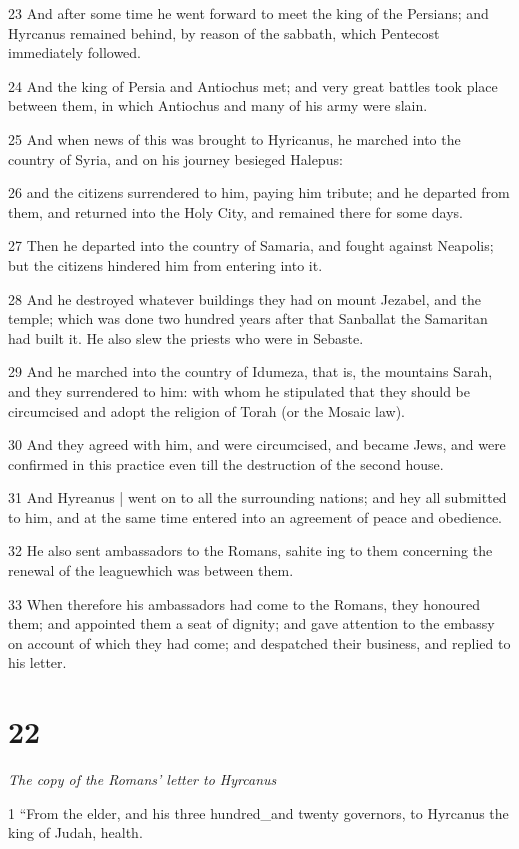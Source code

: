 23 And after some time he went forward to meet the king of the Persians; and Hyrcanus remained behind, by reason of the sabbath, which Pentecost immediately followed. 

24 And the king of Persia and Antiochus met; and very great battles took place between them, in which Antiochus and many of his army were slain. 

25 And when news of this was brought to Hyricanus, he marched into the country of Syria, and on his journey besieged Halepus: 

26 and the citizens surrendered to him, paying him tribute; and he departed from them, and returned into the Holy City, and remained there for some days.

27 Then he departed into the country of Samaria, and fought against Neapolis; but the citizens hindered him from entering into it. 

28 And he destroyed whatever buildings they had on mount Jezabel, and the temple; which was done two hundred years after that Sanballat the Samaritan had built it. He also slew the priests who were in Sebaste. 

29 And he marched into the country of Idumeza, that is, the mountains Sarah, and they surrendered to him: with whom he stipulated that they should be circumcised and adopt the religion of Torah (or the Mosaic law). 

30 And they agreed with him, and were circumcised, and became Jews, and were confirmed in this practice even till the destruction of the second house.

31 And Hyreanus | went on to all the surrounding nations; and hey all submitted to him, and at the same time entered into an agreement of peace and obedience. 

32 He also sent ambassadors to the Romans, sahite ing to them concerning the renewal of the leaguewhich was between them. 

33 When therefore his ambassadors had come to the Romans, they honoured them; and appointed them a seat of dignity; and gave attention to the embassy on account of which they had come; and despatched their business, and replied to his letter. 

\chapter{22}

\textit{The copy of the Romans’ letter to Hyrcanus}

1 “From the elder, and his three hundred_and twenty governors, to Hyrcanus the king of Judah, health. 

